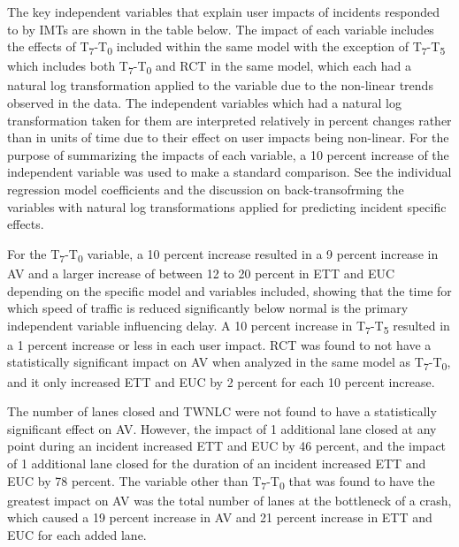 \documentclass[
  letterpaper,
  authoryear]{elsarticle}
\begin{document}
The key independent variables that explain user impacts of incidents
responded to by IMTs are shown in the table below. The impact of each
variable includes the effects of T\textsubscript{7}-T\textsubscript{0}
included within the same model with the exception of
T\textsubscript{7}-T\textsubscript{5} which includes both
T\textsubscript{7}-T\textsubscript{0} and RCT in the same model, which
each had a natural log transformation applied to the variable due to the
non-linear trends observed in the data. The independent variables which
had a natural log transformation taken for them are interpreted
relatively in percent changes rather than in units of time due to their
effect on user impacts being non-linear. For the purpose of summarizing
the impacts of each variable, a 10 percent increase of the independent
variable was used to make a standard comparison. See the individual
regression model coefficients and the discussion on back-transofrming
the variables with natural log transformations applied for predicting
incident specific effects.

For the T\textsubscript{7}-T\textsubscript{0} variable, a 10 percent
increase resulted in a 9 percent increase in AV and a larger increase of
between 12 to 20 percent in ETT and EUC depending on the specific model
and variables included, showing that the time for which speed of traffic
is reduced significantly below normal is the primary independent
variable influencing delay. A 10 percent increase in
T\textsubscript{7}-T\textsubscript{5} resulted in a 1 percent increase
or less in each user impact. RCT was found to not have a statistically
significant impact on AV when analyzed in the same model as
T\textsubscript{7}-T\textsubscript{0}, and it only increased ETT and EUC
by 2 percent for each 10 percent increase.

The number of lanes closed and TWNLC were not found to have a
statistically significant effect on AV. However, the impact of 1
additional lane closed at any point during an incident increased ETT and
EUC by 46 percent, and the impact of 1 additional lane closed for the
duration of an incident increased ETT and EUC by 78 percent. The
variable other than T\textsubscript{7}-T\textsubscript{0} that was found
to have the greatest impact on AV was the total number of lanes at the
bottleneck of a crash, which caused a 19 percent increase in AV and 21
percent increase in ETT and EUC for each added lane.
\end{document}
